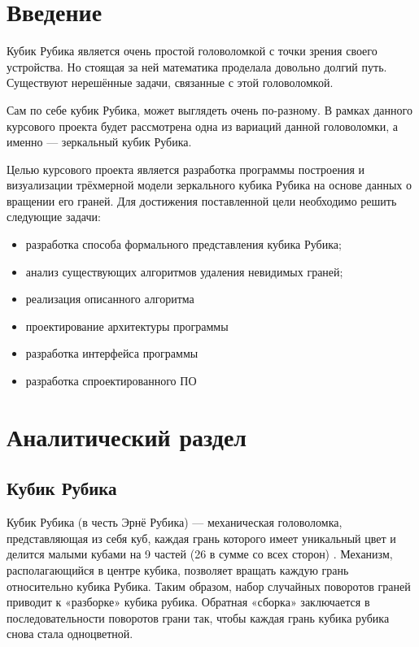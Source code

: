 


\tableofcontents
\section*{Введение}
Кубик Рубика является очень простой головоломкой с точки зрения своего устройства. Но стоящая за ней математика проделала довольно долгий путь. Существуют нерешённые задачи, связанные с этой головоломкой.

Сам по себе кубик Рубика, может выглядеть очень по-разному. В рамках данного курсового проекта будет рассмотрена одна из вариаций данной головоломки, а именно --- зеркальный кубик Рубика.

Целью курсового проекта является разработка программы построения и визуализации трёхмерной модели зеркального кубика Рубика на основе данных о вращении его граней. Для достижения поставленной цели необходимо решить следующие задачи:
\begin{itemize}
	\item разработка способа формального представления кубика Рубика;
	\item анализ существующих алгоритмов удаления невидимых граней;
	\item реализация описанного алгоритма
	\item проектирование архитектуры программы
	\item разработка интерфейса программы
	\item разработка спроектированного ПО
\end{itemize}

\section{Аналитический раздел}
\subsection{Кубик Рубика}
Кубик Рубика (в честь Эрнё Рубика) --- механическая головоломка, представляющая из себя куб,
каждая грань которого имеет уникальный цвет и делится малыми кубами на 9 частей (26 в сумме со всех сторон) \cite{bib:how_to_assemble}.
Механизм, располагающийся в центре кубика, позволяет вращать каждую грань относительно кубика Рубика.
Таким образом, набор случайных поворотов граней приводит к «разборке» кубика рубика.
Обратная «сборка» заключается в последовательности поворотов грани так,
чтобы каждая грань кубика рубика снова стала одноцветной.

